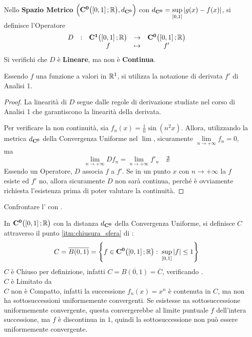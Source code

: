 \begin{proposition}
	\label{prop:operat_D_non_cont}
	Nello \textbf{Spazio Metrico} $\Bigl( \mathbf{C^{0}}\bigl( \left[0,1\right]; \mathbb{R} \bigr), d_{\mathbf{C^{0}}} \Bigr)$ con $d_{\mathbf{C^{0}}} = \sup\limits_{\left[0,1\right]} \left|g(x) - f(x)\right|$, si definisce l'Operatore
	\[
		\begin{array}{ccccc} {D} & : & {
			\mathbf{C^{1}}\bigl( \left[0,1\right]; \mathbb{R} \bigr)
		} & \to & {
			\mathbf{C^{0}}\bigl( \left[0,1\right]; \mathbb{R} \bigr)
		} \\ & & {f} & \mapsto & {f'} \\ \end{array}
	\]
	Si verifichi che $D$ è \textbf{Lineare}, ma non è \textbf{Continua}.
	\begin{note}
		Essendo $f$ una funzione a valori in $\mathbb{R}^1$, si utilizza la  notazione di derivata $f'$ di Analisi 1.
	\end{note}
	\begin{proof}
		La linearità di $D$ segue dalle regole di derivazione studiate nel corso di Analisi 1 che garantiscono la linearità della derivata.

		Per verificare la non continuità, sia $f_n(x) = \frac{1}{n} \sin(n^2 x)$. Allora, utilizzando la metrica $d_{\mathbf{C^{0}}}$ della Convergenza Uniforme nel $\lim$, sicuramente $\lim\limits_{n \to +\infty} f_n = 0$, ma
		\[\lim\limits_{n \to +\infty} Df_n = \lim\limits_{n \to +\infty} f'_n \quad \nexists\]
		Essendo un Operatore, $D$ associa $f$ a $f'$. Se in un punto $x$ con $n \to +\infty$ la $f$ esiste ed $f'$ no, allora sicuramente $D$ non sarà continua, perché è ovviamente richiesta l'esistenza prima di poter valutare la continuità.
	\end{proof}
\end{proposition}
\begin{exercise}
	Confrontare l' con .
\end{exercise}
\begin{example}
	\label{ex:ins_chius_lim_non_compl}
	In $\mathbf{C^{0}} \bigl( \left[0,1\right]; \mathbb{R} \bigr)$ con la distanza $d_{\mathbf{C^{0}}}$ della Convergenza Uniforme, si definisce $C$ attraverso il punto \ref{itm:chiusura_sfera} di :
	\[C = \overline{B(0, 1)} = \left\{f \in \mathbf{C^{0}}\bigl( \left[0,1\right]; \mathbb{R} \bigr):\; \sup\limits_{\left[0,1\right]} \left|f\right| \leq 1\right\}\]
	$C$ è Chiuso per definizione, infatti $C = \overline{B(0, 1)} = \overline{C}$, verificando .\\
	$C$ è Limitato da \\
	$C$ non è Compatto, infatti la successione $f_n(x) = x^n$ è contenuta in $C$, ma non ha sottosuccessioni uniformemente convergenti. Se esistesse na sottosuccessione uniformemente convergente, questa convergerebbe al limite puntuale $f$ dell'intera successione, ma $f$ è discontinua in $1$, quindi la sottosuccessione non può essere uniformemente convergente.
\end{example}
